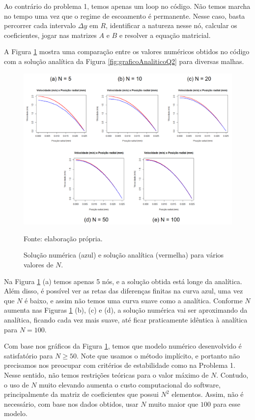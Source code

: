 Ao contrário do problema 1, temos apenas um loop no código. Não temos marcha no tempo uma vez
que o regime de escoamento é permanente. Nesse caso, basta percorrer cada intervalo
$\Delta y$ em $R$, identificar a natureza nesse nó, calcular os coeficientes, jogar nas matrizes
$A$ e $B$ e resolver a equação matricial.

A Figura \ref*{fig:graficoNumericoQ2} mostra uma comparação entre os valores numéricos obtidos no código 
com a solução analítica da Figura \ref*{fig:graficoAnaliticoQ2} para diversas malhas.

\begin{figure}[h!]
    \caption{Solução numérica (azul) e solução analítica (vermelha) para vários valores de $N$.}
    \label{fig:graficoNumericoQ2}
    \centering
    \centerline{\includegraphics[scale=0.5]{graficoNumericoQ2.png}}
    \par{Fonte: elaboração própria.}
\end{figure}

Na Figura \ref*{fig:graficoNumericoQ2} (a) temos apenas 5 nós, e a solução obtida está longe da analítica.
Além disso, é possível ver as retas das diferenças finitas na curva azul, uma vez que $N$ é baixo, e 
assim não temos uma curva suave como a analítica. Conforme $N$ aumenta nas Figuras \ref*{fig:graficoNumericoQ2} (b),
(c) e (d), a solução numérica vai ser aproximando da analítica, ficando cada vez mais suave, até ficar
praticamente idêntica à analítica para $N = 100$.

Com base nos gráficos da Figura \ref*{fig:graficoNumericoQ2}, temos que modelo numérico desenvolvido é
satisfatório para $N \geq 50$. Note que usamos o método implícito, e portanto não precisamos nos preocupar com
critérios de estabilidade como na Problema 1. Nesse sentido, não temos restrições teóricas para o valor máximo
de $N$.
Contudo, o uso de $N$ muito elevando aumenta o custo computacional do software, principalmente da matriz de 
coeficientes que possui $N^2$ elementos. Assim, não é necessário, com base nos dados obtidos, 
usar $N$ muito maior que $100$ para esse modelo.